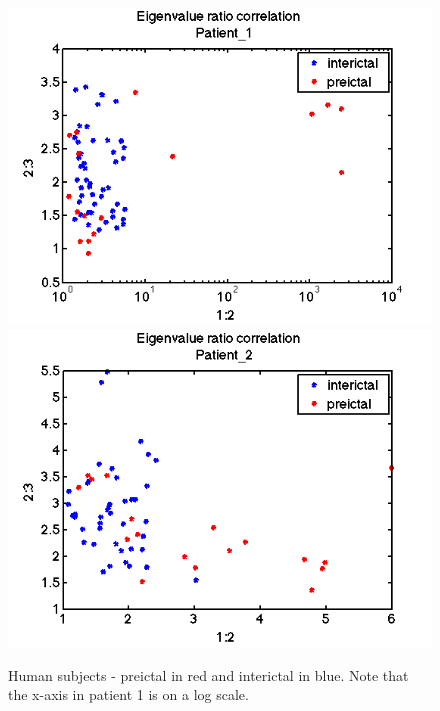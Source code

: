 \documentclass[11pt]{article}
\begin{document}
\begin{figure}[H]
\centering
\includegraphics[width=.45\textwidth]{pictures/evalRatioScatter_patient1.png}
\includegraphics[width=.45\textwidth]{pictures/evalRatioScatter_patient2.png}
\caption{Human subjects - preictal in red and interictal in blue. Note that the x-axis in patient 1 is on a log scale.}
\end{figure}
\end{document}
